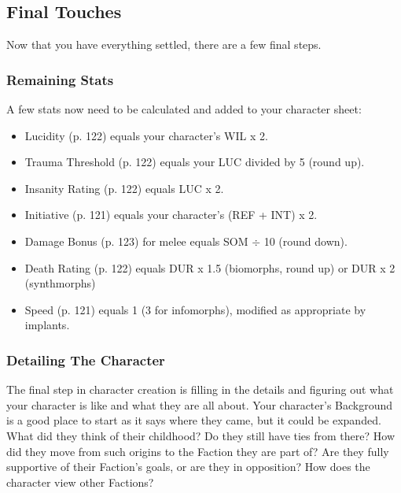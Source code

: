 \subsection{Final Touches}
\label{sec:final-touches}

Now that you have everything settled, there are a few final steps.

\subsubsection{Remaining Stats}
\label{sec:remaining-stats}

A few stats now need to be calculated and added to your character sheet:

\begin{itemize}
\item Lucidity (p. 122) equals your character’s WIL x 2.
\item Trauma Threshold (p. 122) equals your LUC divided by 5 (round up).
\item Insanity Rating (p. 122) equals LUC x 2.
\item Initiative (p. 121) equals your character’s (REF + INT) x 2.
\item Damage Bonus (p. 123) for melee equals SOM $\div$ 10 (round down).
\item Death Rating (p. 122) equals DUR x 1.5 (biomorphs, round up) or DUR x 2 (synthmorphs)
\item Speed (p. 121) equals 1 (3 for infomorphs), modified as appropriate by implants.
\end{itemize} %

\subsubsection{Detailing The Character}
\label{sec:detailing-the-character}

The final step in character creation is filling in the details and figuring out what your character is like and what they are all about. Your character’s Background is a good place to start as it says where they came, but it could be expanded. What did they think of their childhood? Do they still have ties from there? How did they move from such origins to the Faction they are part of? Are they fully supportive of their Faction’s goals, or are they in opposition? How does the character view other Factions?

